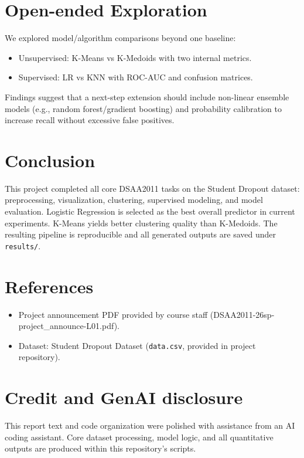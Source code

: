 \documentclass{article}
\begin{document}
\section{Open-ended Exploration}
We explored model/algorithm comparisons beyond one baseline:
\begin{itemize}
    \item Unsupervised: K-Means vs K-Medoids with two internal metrics.
    \item Supervised: LR vs KNN with ROC-AUC and confusion matrices.
\end{itemize}

Findings suggest that a next-step extension should include non-linear ensemble models (e.g., random forest/gradient boosting) and probability calibration to increase recall without excessive false positives.

\section{Conclusion}
This project completed all core DSAA2011 tasks on the Student Dropout dataset: preprocessing, visualization, clustering, supervised modeling, and model evaluation. Logistic Regression is selected as the best overall predictor in current experiments. K-Means yields better clustering quality than K-Medoids. The resulting pipeline is reproducible and all generated outputs are saved under \texttt{results/}.

\section*{References}
\begin{itemize}
    \item Project announcement PDF provided by course staff (DSAA2011-26sp-project\_announce-L01.pdf).
    \item Dataset: Student Dropout Dataset (\texttt{data.csv}, provided in project repository).
\end{itemize}

\section*{Credit and GenAI disclosure}
This report text and code organization were polished with assistance from an AI coding assistant. Core dataset processing, model logic, and all quantitative outputs are produced within this repository's scripts.
\end{document}
